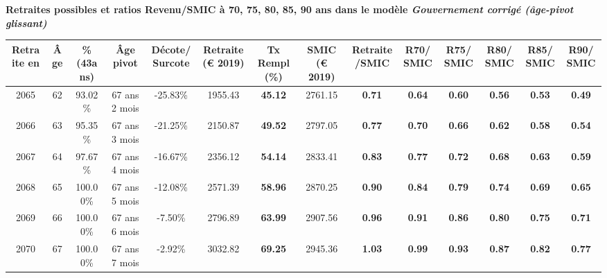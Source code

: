  \vspace{0.1cm} 
{\bf \noindent Retraites possibles et ratios Revenu/SMIC à 70, 75, 80, 85, 90 ans dans le modèle \emph{Gouvernement corrigé (âge-pivot glissant)}}  
 
\begin{adjustbox}{max width=\textwidth} 
\begin{tabular}[htb]{|c|c||c|c|c||c|c||c|c||c|c|c|c|c|} 
\hline 
 Retraite en &  Âge &  \%(43ans) &  Âge pivot &  Décote/Surcote &  Retraite (\euro{} 2019) &  Tx Rempl(\%) &  SMIC (\euro{} 2019) &  Retraite/SMIC &  R70/SMIC &  R75/SMIC &  R80/SMIC &  R85/SMIC &  R90/SMIC \\ 
\hline \hline 
 2065 &  62 &  93.02\% &  67 ans 2 mois &  -25.83\% &  1955.43 &  {\bf 45.12} &  2761.15 &  {\bf {\color{red} 0.71}} &  {\bf {\color{red} 0.64}} &  {\bf {\color{red} 0.60}} &  {\bf {\color{red} 0.56}} &  {\bf {\color{red} 0.53}} &  {\bf {\color{red} 0.49}} \\ 
\hline 
 2066 &  63 &  95.35\% &  67 ans 3 mois &  -21.25\% &  2150.87 &  {\bf 49.52} &  2797.05 &  {\bf {\color{red} 0.77}} &  {\bf {\color{red} 0.70}} &  {\bf {\color{red} 0.66}} &  {\bf {\color{red} 0.62}} &  {\bf {\color{red} 0.58}} &  {\bf {\color{red} 0.54}} \\ 
\hline 
 2067 &  64 &  97.67\% &  67 ans 4 mois &  -16.67\% &  2356.12 &  {\bf 54.14} &  2833.41 &  {\bf {\color{red} 0.83}} &  {\bf {\color{red} 0.77}} &  {\bf {\color{red} 0.72}} &  {\bf {\color{red} 0.68}} &  {\bf {\color{red} 0.63}} &  {\bf {\color{red} 0.59}} \\ 
\hline 
 2068 &  65 &  100.00\% &  67 ans 5 mois &  -12.08\% &  2571.39 &  {\bf 58.96} &  2870.25 &  {\bf {\color{red} 0.90}} &  {\bf {\color{red} 0.84}} &  {\bf {\color{red} 0.79}} &  {\bf {\color{red} 0.74}} &  {\bf {\color{red} 0.69}} &  {\bf {\color{red} 0.65}} \\ 
\hline 
 2069 &  66 &  100.00\% &  67 ans 6 mois &  -7.50\% &  2796.89 &  {\bf 63.99} &  2907.56 &  {\bf {\color{red} 0.96}} &  {\bf {\color{red} 0.91}} &  {\bf {\color{red} 0.86}} &  {\bf {\color{red} 0.80}} &  {\bf {\color{red} 0.75}} &  {\bf {\color{red} 0.71}} \\ 
\hline 
 2070 &  67 &  100.00\% &  67 ans 7 mois &  -2.92\% &  3032.82 &  {\bf 69.25} &  2945.36 &  {\bf 1.03} &  {\bf {\color{red} 0.99}} &  {\bf {\color{red} 0.93}} &  {\bf {\color{red} 0.87}} &  {\bf {\color{red} 0.82}} &  {\bf {\color{red} 0.77}} \\ 
\hline 
\hline 
\end{tabular} 
\end{adjustbox} 
 
